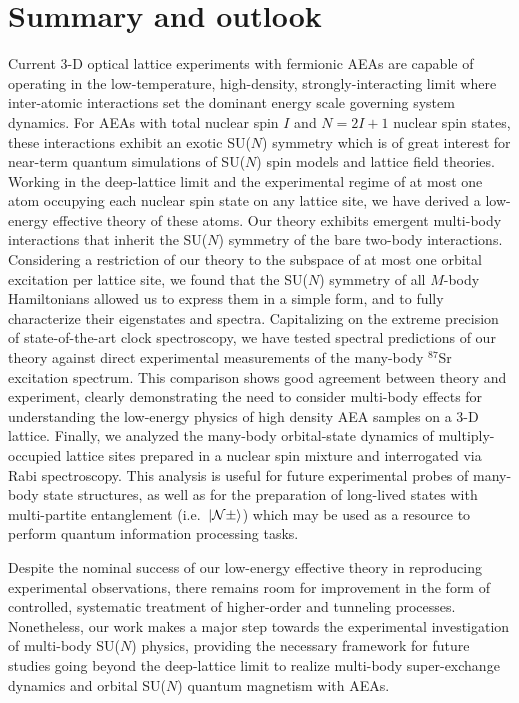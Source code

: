 \documentclass[preprint,showkeys,nofootinbib]{revtex4-1}
\newcommand{\N}{\mathcal{N}}
\newcommand{\1}{\mathds{1}}
\begin{document}
\section{Summary and outlook}
\label{sec:summary}

Current 3-D optical lattice experiments with fermionic AEAs are
capable of operating in the low-temperature, high-density,
strongly-interacting limit where inter-atomic interactions set the
dominant energy scale governing system dynamics.  For AEAs with total
nuclear spin $I$ and $N=2I+1$ nuclear spin states, these interactions
exhibit an exotic SU($N$) symmetry which is of great interest for
near-term quantum simulations of SU($N$) spin models and lattice field
theories.  Working in the deep-lattice limit and the experimental
regime of at most one atom occupying each nuclear spin state on any
lattice site, we have derived a low-energy effective theory of these
atoms.  Our theory exhibits emergent multi-body interactions that
inherit the SU($N$) symmetry of the bare two-body interactions.
Considering a restriction of our theory to the subspace of at most one
orbital excitation per lattice site, we found that the SU($N$)
symmetry of all $M$-body Hamiltonians allowed us to express them in a
simple form, and to fully characterize their eigenstates and spectra.
Capitalizing on the extreme precision of state-of-the-art clock
spectroscopy, we have tested spectral predictions of our theory
against direct experimental measurements of the many-body ${}^{87}$Sr
excitation spectrum.  This comparison shows good agreement between
theory and experiment, clearly demonstrating the need to consider
multi-body effects for understanding the low-energy physics of high
density AEA samples on a 3-D lattice.  Finally, we analyzed the
many-body orbital-state dynamics of multiply-occupied lattice sites
prepared in a nuclear spin mixture and interrogated via Rabi
spectroscopy.  This analysis is useful for future experimental probes
of many-body state structures, as well as for the preparation of
long-lived states with multi-partite entanglement (i.e.~$\ket{\N\pm}$)
which may be used as a resource to perform quantum information
processing tasks.

Despite the nominal success of our low-energy effective theory in
reproducing experimental observations, there remains room for
improvement in the form of controlled, systematic treatment of
higher-order and tunneling processes.  Nonetheless, our work makes a
major step towards the experimental investigation of multi-body
SU($N$) physics, providing the necessary framework for future studies
going beyond the deep-lattice limit to realize multi-body
super-exchange dynamics and orbital SU($N$) quantum magnetism with
AEAs.
\end{document}
